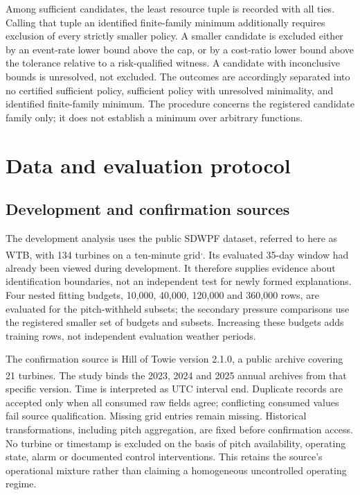 \documentclass[
  british,
  11pt,
]{article}
\begin{document}
Among sufficient candidates, the least resource tuple is recorded with
all ties. Calling that tuple an identified finite-family minimum
additionally requires exclusion of every strictly smaller policy. A
smaller candidate is excluded either by an event-rate lower bound above
the cap, or by a cost-ratio lower bound above the tolerance relative to
a risk-qualified witness. A candidate with inconclusive bounds is
unresolved, not excluded. The outcomes are accordingly separated into no
certified sufficient policy, sufficient policy with unresolved
minimality, and identified finite-family minimum. The procedure concerns
the registered candidate family only; it does not establish a minimum
over arbitrary functions.

\section{Data and evaluation
protocol}\label{data-and-evaluation-protocol}

\subsection{Development and confirmation
sources}\label{development-and-confirmation-sources}

The development analysis uses the public SDWPF dataset, referred to here
as WTB, with 134 turbines on a ten-minute
grid\textsuperscript{,}.
Its evaluated 35-day window had already been viewed during development.
It therefore supplies evidence about identification boundaries, not an
independent test for newly formed explanations. Four nested fitting
budgets, 10,000, 40,000, 120,000 and 360,000 rows, are evaluated for the
pitch-withheld subsets; the secondary pressure comparisons use the
registered smaller set of budgets and subsets. Increasing these budgets
adds training rows, not independent evaluation weather periods.

The confirmation source is Hill of Towie version 2.1.0, a public archive
covering 21 turbines\textsuperscript{}.
The study binds the 2023, 2024 and 2025 annual archives from that
specific version. Time is interpreted as UTC interval end. Duplicate
records are accepted only when all consumed raw fields agree;
conflicting consumed values fail source qualification. Missing grid
entries remain missing. Historical transformations, including pitch
aggregation, are fixed before confirmation access. No turbine or
timestamp is excluded on the basis of pitch availability, operating
state, alarm or documented control interventions. This retains the
source's operational mixture rather than claiming a homogeneous
uncontrolled operating regime.
\end{document}
